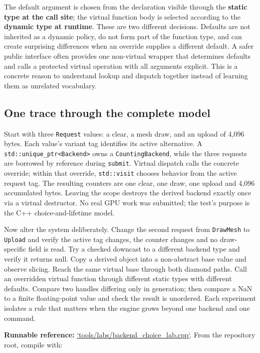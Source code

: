 The default argument is chosen from the declaration visible through the \textbf{static type at the call site}; the virtual function body is selected according to the \textbf{dynamic type at runtime}. These are two different decisions. Defaults are not inherited as a dynamic policy, do not form part of the function type, and can create surprising differences when an override supplies a different default. A safer public interface often provides one non-virtual wrapper that determines defaults and calls a protected virtual operation with all arguments explicit. This is a concrete reason to understand lookup and dispatch together instead of learning them as unrelated vocabulary.

\subsection{One trace through the complete model}\label{05-engine-i-ch004-one-trace-through-the-complete-model}

Start with three \texttt{Request} values: a clear, a mesh draw, and an upload of 4,096 bytes. Each value's variant tag identifies its active alternative. A \texttt{std::unique\_ptr\textless{}Backend\textgreater{}} owns a \texttt{CountingBackend}, while the three requests are borrowed by reference during \texttt{submit}. Virtual dispatch calls the concrete override; within that override, \texttt{std::visit} chooses behavior from the active request tag. The resulting counters are one clear, one draw, one upload and 4,096 accumulated bytes. Leaving the scope destroys the derived backend exactly once via a virtual destructor. No real GPU work was submitted; the test's purpose is the C++ choice-and-lifetime model.

Now alter the system deliberately. Change the second request from \texttt{DrawMesh} to \texttt{Upload} and verify the active tag changes, the counter changes and no draw-specific field is read. Try a checked downcast to a different backend type and verify it returns null. Copy a derived object into a non-abstract base value and observe slicing. Reach the same virtual base through both diamond paths. Call an overridden virtual function through different static types with different defaults. Compare two handles differing only in generation; then compare a NaN to a finite floating-point value and check the result is unordered. Each experiment isolates a rule that matters when the engine grows beyond one backend and one command.

\textbf{Runnable reference:} \hyperref[source-file-9e5ff4ba88e6efabc938832a]{`tools/labs/backend\_choice\_lab.cpp`}. From the repository root, compile with:

